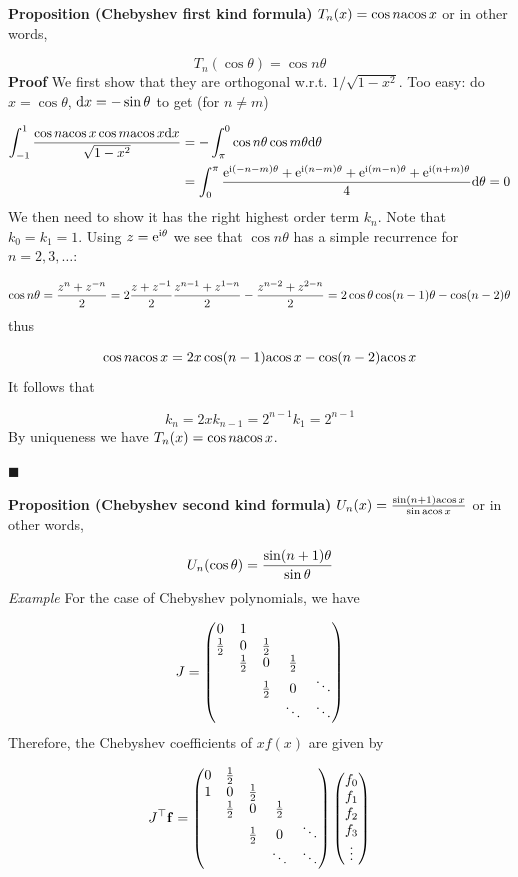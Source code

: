 \documentclass[12pt,a4paper]{article}
\def\half{ {1 \over 2} }
\def\D{ {\rm d} }
\def\I{ {\rm i} }
\def\E{ {\rm e} }
\def\vc#1{ {\mathbf #1} }
\def\acos{ {\rm acos}\, }
\def\addtab#1={#1\;&=}
\def\ccr{\\\addtab}
\def\dx{\D x}
\def\addtab#1={#1\;&=}
\def\ccr{\\\addtab}
\begin{document}
\textbf{Proposition (Chebyshev first kind formula)}  $T_n(x) = \cos n \acos x$ or in other words,

\[
T_n(\cos \theta) = \cos n \theta
\]
\textbf{Proof} We first show that they are orthogonal w.r.t. $1/\sqrt{1-x^2}$. Too easy: do $x = \cos \theta$, $\dx = -\sin \theta$ to get (for $n \neq m$)


\begin{align*}
    \int_{-1}^1 {\cos n \acos x \cos m \acos x \dx \over \sqrt{1-x^2}} &= -\int_\pi^0  \cos n \theta \cos m \theta \D \theta \ccr
    =  \int_0^\pi  {\E^{\I (-n-m)\theta} + \E^{\I (n-m)\theta} + \E^{\I (m-n)\theta} + \E^{\I (n+m)\theta}    \over 4} \D \theta =0
\end{align*}
We then need to show it has the right highest order term $k_n$. Note that $k_0 = k_1 = 1$.  Using $z = \E^{\I \theta}$ we see that $\cos n \theta$ has a simple recurrence for $n=2,3,\ldots$:

\[
\cos n \theta = {z^n + z^{-n} \over 2} = 2 {z + z^{-1} \over 2} {z^{n-1} + z^{1-n} \over 2}- {z^{n-2} + z^{2-n} \over 2} = 
2 \cos \theta \cos (n-1)\theta - \cos(n-2)\theta 
\]
thus 

\[
\cos n \acos x = 2 x \cos(n-1) \acos x - \cos(n-2) \acos x
\]
It follows that 

\[
k_n = 2 x k_{n-1} = 2^{n-1} k_1 = 2^{n-1}
\]
By uniqueness we have $T_n(x) = \cos n \acos x$.

\ensuremath{\blacksquare}

\textbf{Proposition (Chebyshev second kind formula)}  $U_n(x) = {\sin (n+1) \acos x \over \sin \acos x}$ or in other words,

\[
U_n(\cos \theta) = {\sin (n+1) \theta \over \sin \theta}
\]
\emph{Example} For the case of Chebyshev polynomials, we have 

\[
J = \begin{pmatrix} 
0 & 1 \cr
\half & 0 & \half \cr
& \half & 0 & \half \cr
&& \half & 0 & \ddots \cr
&&&\ddots & \ddots
\end{pmatrix} 
\]
Therefore, the Chebyshev coefficients of $x f(x)$ are given by

\[
J^\top \vc f = \begin{pmatrix} 
0 & \half \cr
1 & 0 & \half \cr
& \half & 0 & \half \cr
&& \half & 0 & \ddots \cr
&&&\ddots & \ddots
\end{pmatrix} \begin{pmatrix} f_0\\ f_1\\f_2\\f_3\\\vdots\end{pmatrix}
\]
\end{document}
